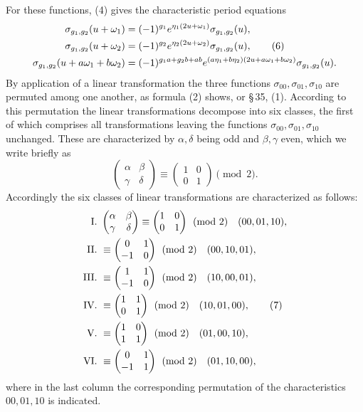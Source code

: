 \documentclass[11pt]{article}
\begin{document}
For these functions, (4) gives the characteristic period equations
\begin{align}
\sigma_{g_1,g_2}(u+\omega_1)&=(-1)^{g_1}e^{\eta_1(2u+
\omega_1)}\sigma_{g_1,g_2}(u),\notag\\
\sigma_{g_1,g_2}(u+\omega_2)&=(-1)^{g_2}e^{\eta_2(2u+
\omega_2)}\sigma_{g_1,g_2}(u), \tag{6}\\
\sigma_{g_1,g_2}(u+a\omega_1+b\omega_2)&=(-1)^{g_1a+g_2b+ab}e^{(a\eta_1+b\eta_2)(2u+a\omega_1+b\omega_2)}\sigma_{g_1,g_2}(u).\notag
\end{align}
By application of a linear transformation the three functions $\sigma_{00},\sigma_{01},\sigma_{10}$ are permuted among one another, as formula (2) shows, or \S\,35, (1). According to this permutation the linear transformations decompose into six classes, the first of which comprises all transformations leaving the functions $\sigma_{00},\sigma_{01},\sigma_{10}$ unchanged. These are characterized by $\alpha,\delta$ being odd and $\beta,\gamma$ even, which we write briefly as
\[
\begin{pmatrix}\alpha&\beta\\\gamma&\delta\end{pmatrix}\equiv
\begin{pmatrix}1&0\\0&1\end{pmatrix}\pmod2.
\]
Accordingly the six classes of linear transformations are characterized as follows:
\begin{align}
\text{I. }&\begin{pmatrix}\alpha&\beta\\\gamma&\delta\end{pmatrix}\equiv
\begin{pmatrix}1&0\\0&1\end{pmatrix}\pmod2\quad (00,01,10),\notag\\
\text{II. }&\equiv\begin{pmatrix}0&1\\-1&0\end{pmatrix}\pmod2\quad (00,10,01),\notag\\
\text{III. }&\equiv\begin{pmatrix}1&1\\-1&0\end{pmatrix}\pmod2\quad (10,00,01),\notag\\
\text{IV. }&\equiv\begin{pmatrix}1&1\\0&1\end{pmatrix}\pmod2\quad (10,01,00), \tag{7}\\
\text{V. }&\equiv\begin{pmatrix}1&0\\1&1\end{pmatrix}\pmod2\quad (01,00,10),\notag\\
\text{VI. }&\equiv\begin{pmatrix}0&1\\-1&1\end{pmatrix}\pmod2\quad (01,10,00),\notag
\end{align}
where in the last column the corresponding permutation of the characteristics $00,01,10$ is indicated.
\end{document}
